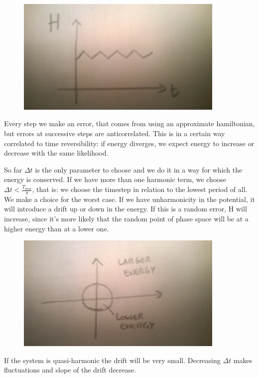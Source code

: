 \documentclass[a4paper, italian, openany]{book}
\begin{document}
\begin{figure}[H]
\centering
\includegraphics[width=100mm]{img/pic5.jpg}
\end{figure}

Every step we make an error, that comes from using an approximate hamiltonian, but errors at successive steps are anticorrelated. This is in a certain way correlated to time reversibility: if energy diverges, we expect energy to increase or decrease with the same likelihood. 

So far $\Delta t$ is the only parameter to choose and we do it in a way for which the energy is conserved.\newline
If we have more than one harmonic term, we choose $\Delta t < \frac{T_{min}}{\pi}$, that is: we choose the timestep in relation to the lowest period of all. We make a choice for the worst case.\newline
If we have unharmonicity in the potential, it will introduce a drift up or down in the energy. If this is a random error, H will increase, since it's more likely that the random point of phase space will be at a higher energy than at a lower one.

\begin{figure}[H]
\centering
\includegraphics[width=100mm]{img/pic6.jpg}
\end{figure}

If the system is quasi-harmonic the drift will be very small. Decreasing $\Delta t$ makes fluctuations and slope of the drift decrease.
\end{document}
